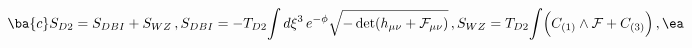 \begin{equation}
\ba{c} S_{D2} = S_{DBI} + S_{WZ}\,,\\
{}\\
S_{DBI} = -T_{D2}\displaystyle{\int d\xi^{3}}\,
e^{-\phi}\sqrt{-\det(h_{\mu\nu} + {\cal F}_{\mu\nu})}\,, \\
{}\\
 S_{WZ}  = T_{D2}\displaystyle{\int} \Big(C_{(1)}\wedge {\cal F} +
C_{(3)}\Big)\,, \ea
\end{equation}

